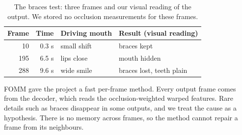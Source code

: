 \begin{table}[tb]
  \centering
  \footnotesize
  \begin{tabular}{@{}r r l l@{}}
    \toprule
    Frame & Time & Driving mouth & Result (visual reading) \\
    \midrule
    10 & 0.3 s & small shift & braces kept \\
    195 & 6.5 s & lips close & mouth hidden \\
    288 & 9.6 s & wide smile & braces lost, teeth plain \\
    \bottomrule
  \end{tabular}
  \caption{The braces test: three frames and our visual reading of the output.
    We stored no occlusion measurements for these frames.}
  \label{tab:fomm_braces}
\end{table}

FOMM gave the project a fast per-frame method. Every output frame comes from
the decoder, which reads the occlusion-weighted warped features. Rare details
such as braces disappear in some outputs, and we treat the cause as a
hypothesis. There is no memory across frames, so the method cannot repair a
frame from its neighbours.
